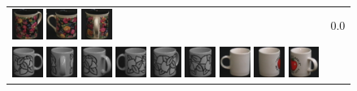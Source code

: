 \begin{figure}[tbp]
\begin{center}
\begin{tabular}{m{11cm} | m{3cm} |}
\includegraphics[width=1cm]{coil/beeld-63.eps}
\includegraphics[width=1cm]{coil/beeld-61.eps}
\includegraphics[width=1cm]{coil/beeld-65.eps}
& {\scriptsize 0.0}
\\
\includegraphics[width=1cm]{coil/beeld-48.eps}
\includegraphics[width=1cm]{coil/beeld-50.eps}
\includegraphics[width=1cm]{coil/beeld-49.eps}
\includegraphics[width=1cm]{coil/beeld-51.eps}
\includegraphics[width=1cm]{coil/beeld-53.eps}
\includegraphics[width=1cm]{coil/beeld-52.eps}
\includegraphics[width=1cm]{coil/beeld-37.eps}
\includegraphics[width=1cm]{coil/beeld-38.eps}
\includegraphics[width=1cm]{coil/beeld-40.eps}

\end{tabular}
\end{center}
\end{figure}
